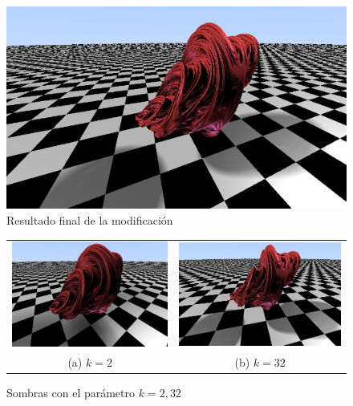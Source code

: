 \begin{figure} [ht]
    \centering
    \includegraphics[scale = 0.45]{img/C8/sombras-final.png}
    \caption{Resultado final de la modificación}
    \label{fig:sombras-final}
\end{figure}


\begin{figure}[ht]
    \centering
    \begin{tabular}{cc}
        \includegraphics[scale=0.4]{img/C8/sombras-k-2.png} &
      \includegraphics[scale=0.42]{img/C8/sombras-k-32.png} \\    
    (a) $k=2$ & (b) $k=32$  \\
    \end{tabular}
    \caption{Sombras con el parámetro $k=2,32$}
    \label{fig:sombras-k}
\end{figure}

